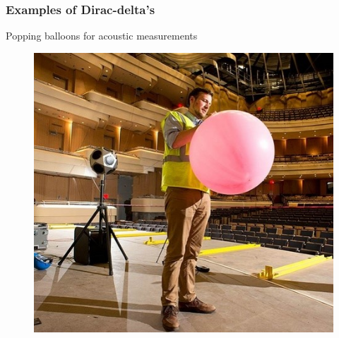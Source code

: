 \begin{frame}
	\frametitle{Examples of Dirac-delta’s}
	Popping balloons for acoustic measurements
\begin{figure}
\centering
\includegraphics[height=0.7\textheight]{Images/discrete_time_systems_9}
\label{fig:discrete_time_systems_9}
\end{figure}

\end{frame}
